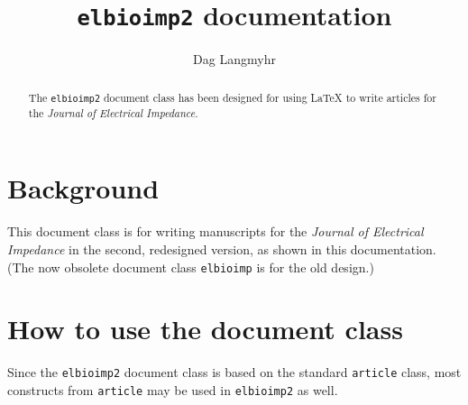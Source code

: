 \documentclass[UKenglish]{elbioimp2}
\title{\texttt{elbioimp2} documentation}
\author{Dag Langmyhr\affiliation{Department of Informatics, University
    of Oslo, Norway \url{dag@ifi.uio.no}}}
\newcommand{\p}[1]{\texttt{#1}}
\begin{document}
\maketitle

\begin{abstract}
  The \p{elbioimp2} document class has been designed for using
  \LaTeX{} to write articles for the \emph{Journal of Electrical
    Impedance}. 

\end{abstract}


\section{Background}
This document class is for writing manuscripts for the \emph{Journal
  of Electrical Impedance} in the second, redesigned version, as
shown in this documentation. (The now obsolete document class
\p{elbioimp} is for the old design.)

\section{How to use the document class}
Since the \p{elbioimp2} document class is based on the standard
\p{article} class, most constructs from \p{article} may be used in
\p{elbioimp2} as well.
\end{document}
